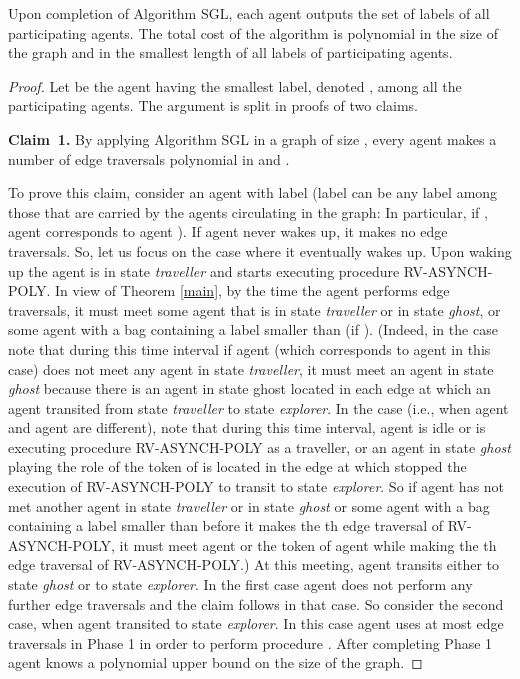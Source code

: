 \documentclass [11pt] {article}
\begin{document}
\begin{theorem}\label{sgl} 
Upon completion of Algorithm SGL, each agent outputs the set of labels of all participating agents. The total cost of the algorithm is polynomial 
in the size of the graph 
and in the smallest length of all labels of participating agents.
\end{theorem}









\begin{proof}
{Let  be the agent having the smallest label, denoted , among all the participating agents. The argument is split in proofs of two claims.}

\vspace*{0.3cm}
\noindent
{{\bf Claim~1.} By applying Algorithm SGL in a graph of size , every agent makes a number of edge traversals polynomial in  and .}

{To prove this claim, consider an agent  with label  {(label  can be any label among those that are carried by the agents circulating in the graph: In particular, if , agent  corresponds to agent )}. If agent  never wakes up, it makes no edge traversals. So, let us focus on the case where it eventually wakes up. Upon waking up the agent is in state {\em traveller} and starts executing  procedure RV-ASYNCH-POLY. In view of Theorem \ref{main},  
by the time the agent performs  edge traversals, it must meet some agent that is in state {\em traveller} or in state {\em ghost}, or some agent with a bag containing a label smaller than  (if ).} ({Indeed, in the case  note that during this time interval if agent  (which corresponds to agent  in this case) does not meet any agent in state {\em traveller}, it must meet an agent in state {\em ghost} because there is an agent in state ghost located in each edge at which an agent transited from state {\em traveller} to state {\em explorer}. In the case  (i.e., when agent  and agent  are different), note that} during this time interval, agent  is idle or is executing procedure RV-ASYNCH-POLY as a traveller, or an agent in state {\em ghost} playing the role of the token of  is located in the edge at which  stopped the execution of RV-ASYNCH-POLY to transit to state {\em explorer}. So if agent  has not met another agent in state {\em traveller} or in state {\em ghost} or some agent with a bag containing a label smaller than  before it makes the th edge traversal of RV-ASYNCH-POLY, it must meet agent  or the token of agent  while making the th edge traversal of RV-ASYNCH-POLY.) At this meeting, agent  transits either to state
{\em ghost} or to state {\em explorer}. In the first case agent  does not perform any further edge traversals and the claim follows in that case. So consider the second case, when agent  transited to state {\em explorer}.
In this case  agent   uses at most 
{ edge traversals in Phase 1 in order to perform procedure }.
After completing Phase 1 agent  knows a polynomial upper bound  on the size of the graph. 


\end{proof}
\end{document}

